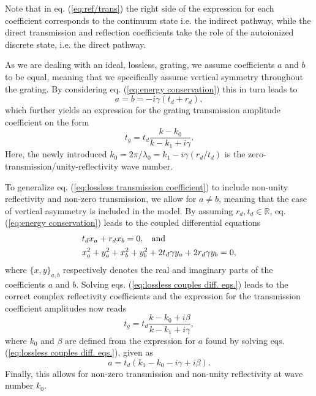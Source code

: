 Note that in eq. (\ref{eq:ref/trans}) the right side of the expression for each coefficient corresponds to the continuum state i.e. the indirect pathway, while the direct transmission and reflection coefficients take the role of the autoionized discrete state, i.e. the direct pathway\cite{Fano-theory}.

As we are dealing with an ideal, lossless, grating, we assume coefficients $a$ and $b$ to be equal, meaning that we specifically assume vertical symmetry throughout the grating. By considering eq. (\ref{eq:energy conservation}) this in turn leads to 
\begin{equation}
    a = b = -i \gamma (t_d + r_d),
\end{equation}
which further yields an expression for the grating transmission amplitude coefficient on the form
\begin{equation}
    t_g = t_d \frac{k - k_0}{k - k_1 + i \gamma}.
    \label{eq:lossless transmission coefficient}
\end{equation}
Here, the newly introduced $k_0 = 2\pi/\lambda_0 = k_1 -i \gamma (r_d/t_d)$ is the zero-transmission/unity-reflectivity wave number.

To generalize eq. (\ref{eq:lossless transmission coefficient}) to include non-unity reflectivity and non-zero transmission, we allow for $a \neq b$\cite{Bykov}\cite{Darki2}\cite{Parthenopoulos}, meaning that the case of vertical asymmetry is included in the model\cite{Popov}. By assuming $r_d,t_d \in \mathbb{R}$, eq. (\ref{eq:energy conservation}) leads to the coupled differential equations
\begin{equation}
    \begin{split}
        &t_d x_a + r_d x_b = 0, \hspace{0.3cm} \text{and} \\
        &x_a^2 + y_a^2 + x_b^2 + y_b^2 + 2 t_d \gamma y_a + 2 r_d \gamma y_b = 0,
    \end{split}
    \label{eq:lossless couples diff. eqs.}
\end{equation}
where $\{x,y\}_{a,b}$ respectively denotes the real and imaginary parts of the coefficients $a$ and $b$. Solving eqs. (\ref{eq:lossless couples diff. eqs.}) leads to the correct complex reflectivity coefficients and the expression for the transmission coefficient amplitudes now reads
\begin{equation}
    t_g = t_d \frac{k - k_0 + i \beta}{k - k_1 + i \gamma},
    \label{eq:transmission_coefficients_non_zero_values}
\end{equation}
where $k_0$ and $\beta$ are defined from the expression for $a$ found by solving eqs. (\ref{eq:lossless couples diff. eqs.}), given as
\begin{equation}
    a = t_d (k_1 - k_0 - i \gamma + i \beta).
\end{equation}
Finally, this allows for non-zero transmission and non-unity reflectivity at wave number $k_0$.

